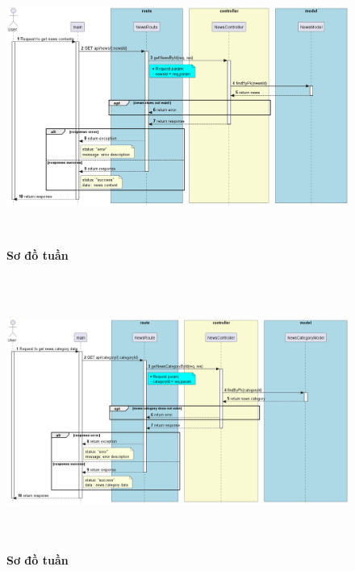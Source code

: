 \begin{figure}[H]
  \centering
  \includegraphics[width=16cm,height=9cm]{Images/server/sequence/server/getNewsById.png}
  \caption[Sơ đồ tuần tự ]{\bfseries \fontsize{12pt}{0pt}
  \selectfont Sơ đồ tuần }
  \label{hinh21} %
\end{figure}


\begin{figure}[H]
  \centering
  \includegraphics[width=16cm,height=9cm]{Images/server/sequence/server/getNewsCategoryById.png}
  \caption[Sơ đồ tuần tự ]{\bfseries \fontsize{12pt}{0pt}
  \selectfont Sơ đồ tuần }
  \label{hinh21} %
\end{figure}

